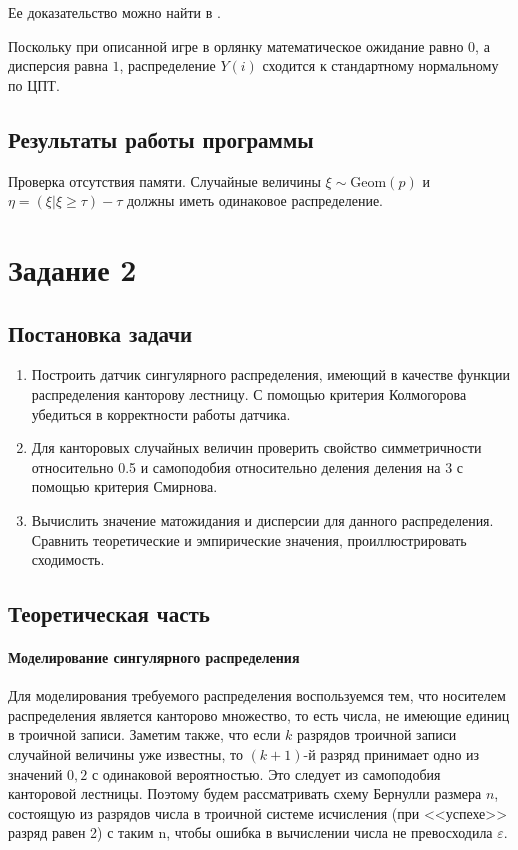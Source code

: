 \documentclass[16pt]{article}
\begin{document}
Ее доказательство можно найти в \cite{Shir}.

Поскольку при описанной игре в орлянку математическое ожидание равно $0$, а дисперсия равна $1$, распределение $Y(i)$ сходится к стандартному нормальному по ЦПТ. 

\subsection{Результаты работы программы}
Проверка отсутствия памяти. Случайные величины $\xi \sim \mathrm{Geom}(p)$ и $\eta = (\xi | \xi \geq \tau) - \tau$ должны иметь одинаковое распределение.

\section{Задание 2}
\subsection{Постановка задачи}
\begin{enumerate}
\item Построить датчик сингулярного распределения, имеющий в качестве функции распределения канторову лестницу. С помощью критерия Колмогорова убедиться в корректности работы датчика.
\item Для канторовых случайных величин проверить свойство симметричности относительно 0.5 и самоподобия относительно деления деления на 3 с помощью критерия Смирнова.
\item Вычислить значение матожидания и дисперсии для данного распределения. Сравнить теоретические и эмпирические значения, проиллюстрировать сходимость.
\end{enumerate}

\subsection{Теоретическая часть}

\paragraph{Моделирование сингулярного распределения}

Для моделирования требуемого распределения воспользуемся тем, что носителем распределения является канторово множество, то есть числа, не имеющие единиц в троичной записи. Заметим также, что если $k$ разрядов троичной записи случайной величины уже известны, то $(k+1)$-й разряд принимает одно из значений $0, 2$ с одинаковой вероятностью. Это следует из самоподобия канторовой лестницы. Поэтому будем рассматривать схему Бернулли размера $n$, состоящую из разрядов числа в троичной системе исчисления (при <<успехе>> разряд равен 2) с таким n, чтобы ошибка в вычислении числа не превосходила $\varepsilon$.
\end{document}

